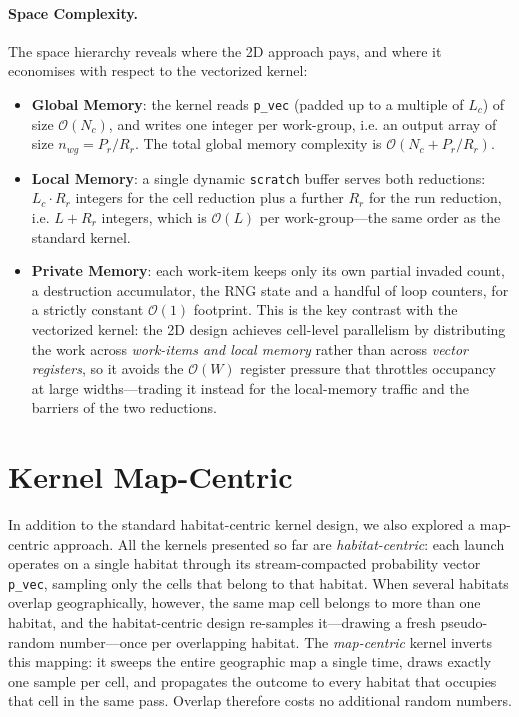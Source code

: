 \paragraph{Space Complexity.}
The space hierarchy reveals where the 2D approach pays, and where it economises with respect to the vectorized kernel:
\begin{itemize}
    \item \textbf{Global Memory}: the kernel reads \texttt{p\_vec} (padded up to a multiple of $L_c$) of size $\mathcal{O}(N_c)$, and writes one integer per work-group, i.e. an output array of size $n_{wg} = P_r / R_r$. The total global memory complexity is $\mathcal{O}(N_c + P_r / R_r)$.
    \item \textbf{Local Memory}: a single dynamic \texttt{scratch} buffer serves both reductions: $L_c \cdot R_r$ integers for the cell reduction plus a further $R_r$ for the run reduction, i.e. $L + R_r$ integers, which is $\mathcal{O}(L)$ per work-group---the same order as the standard kernel.
    \item \textbf{Private Memory}: each work-item keeps only its own partial invaded count, a destruction accumulator, the RNG state and a handful of loop counters, for a strictly constant $\mathcal{O}(1)$ footprint. This is the key contrast with the vectorized kernel: the 2D design achieves cell-level parallelism by distributing the work across \emph{work-items and local memory} rather than across \emph{vector registers}, so it avoids the $\mathcal{O}(W)$ register pressure that throttles occupancy at large widths---trading it instead for the local-memory traffic and the barriers of the two reductions.
\end{itemize}

\section{Kernel Map-Centric}\label{sec:kernel_map_centric}
In addition to the standard habitat-centric kernel design, we also explored a map-centric approach. All the kernels presented so far are \emph{habitat-centric}: each launch operates on a single habitat through its stream-compacted probability vector \texttt{p\_vec}, sampling only the cells that belong to that habitat. When several habitats overlap geographically, however, the same map cell belongs to more than one habitat, and the habitat-centric design re-samples it---drawing a fresh pseudo-random number---once per overlapping habitat. The \emph{map-centric} kernel inverts this mapping: it sweeps the entire geographic map a single time, draws exactly one sample per cell, and propagates the outcome to every habitat that occupies that cell in the same pass. Overlap therefore costs no additional random numbers.

